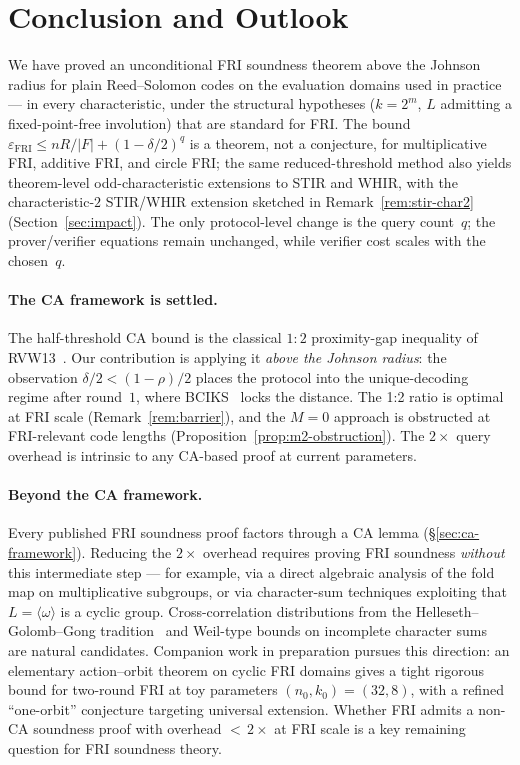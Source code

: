 \documentclass[11pt]{article}
\begin{document}
\section{Conclusion and Outlook}
\label{sec:conclusion}

We have proved an unconditional FRI soundness theorem above the Johnson radius for plain Reed--Solomon codes on the evaluation domains used in practice --- in every characteristic, under the structural hypotheses ($k = 2^m$, $L$ admitting a fixed-point-free involution) that are standard for FRI. The bound $\varepsilon_{\mathrm{FRI}} \leq nR/|F| + (1{-}\delta/2)^q$ is a theorem, not a conjecture, for multiplicative FRI, additive FRI, and circle FRI; the same reduced-threshold method also yields theorem-level odd-characteristic extensions to STIR and WHIR, with the characteristic-$2$ STIR/WHIR extension sketched in Remark~\ref{rem:stir-char2} (Section~\ref{sec:impact}). The only protocol-level change is the query count~$q$; the prover/verifier equations remain unchanged, while verifier cost scales with the chosen~$q$.

\paragraph{The CA framework is settled.}
The half-threshold CA bound is the classical $1{:}2$ proximity-gap inequality of RVW13~\cite{RVW}. Our contribution is applying it \emph{above the Johnson radius}: the observation $\delta/2 < (1{-}\rho)/2$ places the protocol into the unique-decoding regime after round~$1$, where BCIKS~\cite{BCIKS} locks the distance. The 1:2 ratio is optimal at FRI scale (Remark~\ref{rem:barrier}), and the $M = 0$ approach is obstructed at FRI-relevant code lengths (Proposition~\ref{prop:m2-obstruction}). The $2\times$ query overhead is intrinsic to any CA-based proof at current parameters.

\paragraph{Beyond the CA framework.}
Every published FRI soundness proof factors through a CA lemma (\S\ref{sec:ca-framework}). Reducing the $2\times$ overhead requires proving FRI soundness \emph{without} this intermediate step --- for example, via a direct algebraic analysis of the fold map on multiplicative subgroups, or via character-sum techniques exploiting that $L = \langle\omega\rangle$ is a cyclic group. Cross-correlation distributions from the Helleseth--Golomb--Gong tradition~\cite{Helleseth76,GolombGong} and Weil-type bounds on incomplete character sums~\cite{MorenoMoreno} are natural candidates. Companion work in preparation pursues this direction: an elementary action--orbit theorem on cyclic FRI domains gives a tight rigorous bound for two-round FRI at toy parameters $(n_0, k_0) = (32, 8)$, with a refined ``one-orbit'' conjecture targeting universal extension. Whether FRI admits a non-CA soundness proof with overhead ${<}\,2\times$ at FRI scale is a key remaining question for FRI soundness theory.
\end{document}

